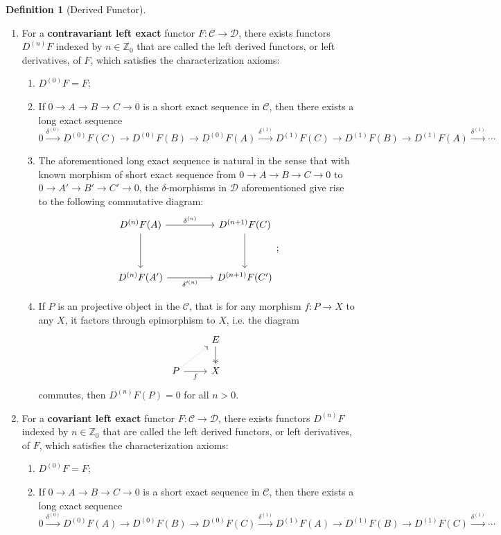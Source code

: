 \documentclass[10pt]{report}
\theoremstyle{definition}
\newtheorem{definition}{Definition}
\begin{document}
\begin{definition}[Derived Functor]
\begin{enumerate}
\item For a \textbf{contravariant left exact} functor $F:\mathcal{C}\to\mathcal{D}$, there exists functors $D^{(n)}F$ indexed by $n\in\mathbb{Z}_0$ that are called the left derived functors, or left derivatives, of $F$, which satisfies the characterization axioms:
\begin{enumerate}
\item $D^{(0)}F=F$;
\item If $0\to A\to B\to C\to 0$ is a short exact sequence in $\mathcal{C}$, then there exists a long exact sequence $$0\overset{\delta^{(0)}}{\to}D^{(0)}F(C)\to D^{(0)}F(B)\to D^{(0)}F(A)\overset{\delta^{(1)}}{\to}D^{(1)}F(C)\to D^{(1)}F(B)\to D^{(1)}F(A)\overset{\delta^{(1)}}{\to}\cdots$$

\item The aforementioned long exact sequence is natural in the sense that with known morphism of short exact sequence from $0\to A\to B\to C\to0$ to $0\to A'\to B'\to C'\to0$, the $\delta$-morphisms in $\mathcal{D}$ aforementioned give rise to the following commutative diagram:
        $$
        \begin{tikzcd}
D^{(n)}F(A) \arrow[rr, "\delta^{(n)}"] \arrow[dd] &  & D^{(n+1)}F(C) \arrow[dd] \\
                                                  &  &                          \\
D^{(n)}F(A') \arrow[rr, "\delta'^{(n)}"']         &  & D^{(n+1)}F(C')
\end{tikzcd};
        $$
\item If $P$ is an projective object in the $\mathcal{C}$, that is for any morphism $f:P\to X$ to any $X$, it factors through epimorphism to $X$, i.e. the diagram
    $$
    \begin{tikzcd}
                                     & E \arrow[d, two heads] \\
P \arrow[r, "f"'] \arrow[ru, dotted] & X
\end{tikzcd}
    $$
    commutes, then $D^{(n)}F(P)=0$ for all $n>0$.
\end{enumerate}
\item For a \textbf{covariant left exact} functor $F:\mathcal{C}\to\mathcal{D}$, there exists functors $D^{(n)}F$ indexed by $n\in\mathbb{Z}_0$ that are called the left derived functors, or left derivatives, of $F$, which satisfies the characterization axioms:
\begin{enumerate}
\item $D^{(0)}F=F$;
\item If $0\to A\to B\to C\to 0$ is a short exact sequence in $\mathcal{C}$, then there exists a long exact sequence $$0\overset{\delta^{(0)}}{\to}D^{(0)}F(A)\to D^{(0)}F(B)\to D^{(0)}F(C)\overset{\delta^{(1)}}{\to}D^{(1)}F(A)\to D^{(1)}F(B)\to D^{(1)}F(C)\overset{\delta^{(1)}}{\to}\cdots$$


\end{enumerate}
\end{enumerate}
\end{definition}
\end{document}
